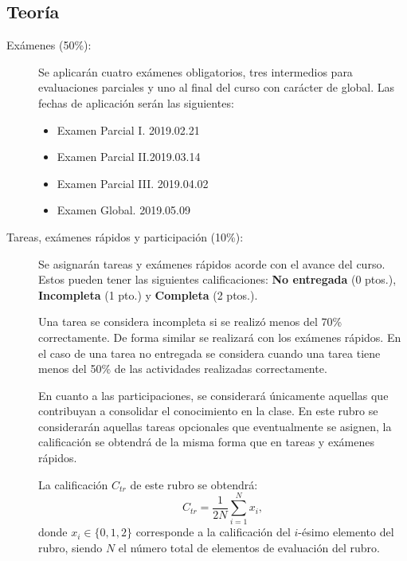 \documentclass[letterpaper, 11pt]{article}
\begin{document}
\subsection{Teoría}  
		\begin{description} 
			\item [Exámenes (50\%):] Se aplicarán cuatro exámenes obligatorios, tres intermedios para evaluaciones parciales y uno al final del curso con carácter de global. Las fechas de aplicación serán las siguientes:
			  \begin{itemize}
			    \item Examen Parcial I. \hspace{5pt}2019.02.21
			    \item Examen Parcial II.\hspace{4pt}2019.03.14
			    \item Examen Parcial III. 2019.04.02
			    \item Examen Global. \hspace{15pt}2019.05.09
			  \end{itemize}
			\item [Tareas, exámenes rápidos y participación (10\%):] Se asignarán tareas y exámenes rápidos acorde con el avance del curso. Estos pueden tener las siguientes calificaciones: \textbf{No entregada} (0 ptos.), \textbf{Incompleta} (1 pto.) y \textbf{Completa} (2 ptos.). 
			
Una tarea se considera incompleta si se realizó menos del 70\% correctamente. De forma similar se realizará con los exámenes rápidos. En el caso de una tarea no entregada se considera cuando una tarea tiene menos del 50\% de las actividades realizadas correctamente.

En cuanto a las participaciones, se considerará únicamente aquellas que contribuyan a consolidar el conocimiento en la clase. En este rubro se considerarán aquellas tareas opcionales que eventualmente se asignen, la calificación se obtendrá de la misma forma que en tareas y exámenes rápidos. 

La calificación $C_{tr}$ de este rubro se obtendrá:
$$C_{tr}=\dfrac{1}{2N}\sum_{i=1}^N x_i,$$
donde $x_i\in\{0,1,2\}$ corresponde a la calificación del $i$-ésimo elemento del rubro, siendo $N$ el número total de elementos de evaluación del rubro.
		\end{description}
	
\end{document}
